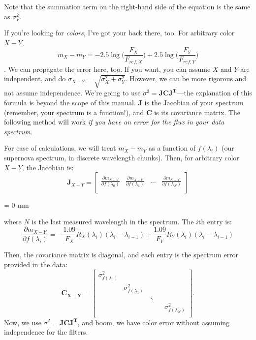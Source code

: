 Note that the summation term on the right-hand side of the equation is the same as $\sigma_{F}^{2}$. 

If you're looking for \textit{colors}, I've got your back there, too. For arbitrary color $X-Y$,
\begin{equation}
    m_{X} - m_{Y} = -2.5\log \Big( \frac{F_{X}}{F_{ref,X}} \Big) + 2.5\log \Big( \frac{F_{Y}}{F_{ref,Y}} \Big)
\end{equation}.
We can propagate the error here, too. If you want, you can assume $X$ and $Y$ are independent, and do $\sigma_{X-Y} = \sqrt{\sigma_{X}^{2} + \sigma_{Y}^{2}}$. However, we can be more rigorous and not assume independence. We're going to use $\sigma^{2} = \mathbf{JCJ^{T}}$---the explanation of this formula is beyond the scope of this manual. $\mathbf{J}$ is the Jacobian of your spectrum (remember, your spectrum is a function!), and $\mathbf{C}$ is its covariance matrix. The following method will work \textit{if you have an error for the flux in your data spectrum}.

For ease of calculations, we will treat $m_{X}-m_{Y}$ as a function of $f(\lambda_{i})$ (our supernova spectrum, in discrete wavelength chunks). Then, for arbitrary color $X-Y$, the Jacobian is:
\begin{equation}
\label{eqn:jac2}
\mathbf{J}_{X-Y} = 
\begin{bmatrix}
    
        \frac{\partial m_{X-Y}}{\partial f(\lambda_{0})} & \frac{\partial m_{X-Y}}{\partial f (\lambda_{1})} & \dots & \frac{\partial m_{X-Y}}{\partial f(\lambda_{N})} \\
    
\end{bmatrix}
\end{equation}

\parindent = 0 mm

where $N$ is the last measured wavelength in the spectrum. The $i$th entry is: 
\begin{equation}
    \frac{\partial m_{X-Y}}{\partial f(\lambda_{i})} = -\frac{1.09}{F_{X}} R_{X}(\lambda_{i})(\lambda_{i}-\lambda_{i-1}) + \frac{1.09}{F_{Y}}R_{Y}(\lambda_{i})(\lambda_{i}-\lambda_{i-1})
\end{equation}

Then, the covariance matrix is diagonal, and each entry is the spectrum error provided in the data:
\begin{equation}\mathbf{C_{X-Y}} = 
    \begin{bmatrix}
        \sigma_{f(\lambda_{0})}^{2} &  & & \\
         & \sigma_{f(\lambda_{1})}^{2}&  & \\
         &  & \ddots &  \\
        & & & & \sigma_{f(\lambda_{N})}^{2}\\
    \end{bmatrix}.
    \label{eqn:cov}
\end{equation}
Now, we use $\sigma^{2} = \mathbf{JCJ^{T}}$, and boom, we have color error without assuming independence for the filters. 

